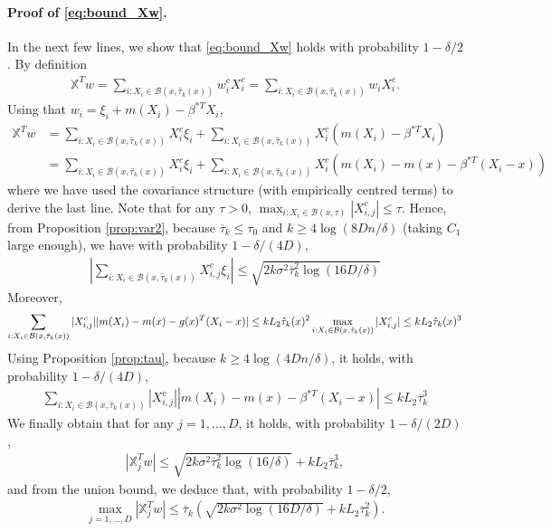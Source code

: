 \paragraph{Proof of \eqref{eq:bound_Xw}.}  In the next few lines, we show that \eqref{eq:bound_Xw} holds with probability $1-\delta/2$. By definition 
\begin{align*}
\mathbb X^T w = \sum_{i : X_i \in \mathcal B (x, \hat \tau_k(x)) }  w_i^c  X_{i}^c =\sum_{i : X_i \in \mathcal B (x, \hat \tau_k(x)) } w_i X_{i} ^c  .
\end{align*}
Using that $w_i = \xi_i+ m(X_i) - \beta^{*T} X_i$,
\begin{align*}
   \mathbb X^T w  & = \sum_{i : X_i \in \mathcal B (x, \hat \tau_k(x)) } X_{i} ^c \xi_i   +  \sum_{i : X_i \in \mathcal B (x, \hat \tau_k(x)) } X_{i} ^c (m(X_i) - \beta^{*T}X_i)\\
 &= \sum_{i : X_i \in \mathcal B (x, \hat \tau_k(x)) } X_{i} ^c \xi_i    +\sum_{i : X_i \in \mathcal B (x, \hat \tau_k(x)) } X_{i} ^c (m(X_i) - m(x) - \beta^{*T}(X_i-x) )
\end{align*}
where we have used the covariance structure (with empirically centred terms) to derive the last line.
Note that for any $\tau >0$, $\max_{i : X_i \in \mathcal B (x,  \tau )} |  X_{i,j} ^c| \leq  \tau$.  Hence, from Proposition \ref{prop:var2}, because $\overline \tau_k\leq \tau_0$ and $k\geq 4   \log( 8D n/\delta)$ (taking $C_1$ large enough), we have with probability $1-\delta / (4D)$,
\begin{align*}
\left|  \sum_{i : X_i \in \mathcal B (x, \hat \tau_k(x)) } X_{i,j} ^c \xi_i   \right| \leq \sqrt{ 2 k \sigma^2 \overline \tau_k ^2 \log(16D/\delta) }
\end{align*}
Moreover,
\begin{equation*}
\sum_{i : X_i \in \mathcal B (x, \hat \tau_k(x)) } | X_{i,j} ^c|  | m (X_i) -  m (x) - g(x) ^{T}(X_i-x) | \leq\\
 k L_2 \hat \tau_k (x) ^2 \max_{i : X_i \in \mathcal B (x, \hat \tau_k(x) )} |  X_{i,j} ^c| \leq k L_2 \hat \tau_k (x) ^3
\end{equation*}
Using Proposition \ref{prop:tau}, because $k\geq 4   \log( 4D n/\delta) $, it holds, with probability $1-\delta/(4D)$,
\begin{align*}
\sum_{i : X_i \in \mathcal B (x, \hat \tau_k(x)) } | X_{i,j} ^c|  | m (X_i) -  m (x) - \beta^{*T}(X_i-x) | \leq  k L_2 \overline \tau_k  ^3
\end{align*}
We finally obtain that for any $j=1,\ldots, D$, it holds, with probability $1-\delta/(2D)$,
\begin{align*}
|   \mathbb X^T_j w | \leq  \sqrt{2 k \sigma^2 \overline \tau_k ^2 \log(16/\delta) } +   k L_2 \overline \tau_k ^3,
\end{align*}
and from the union bound, we deduce that, with probability $1-\delta/2$,
\begin{align*}
\max_{j=1,\ldots, D} |   \mathbb X^T_j w | \leq  \overline \tau_k   \left( \sqrt{2 k  \sigma^2   \log(16D/\delta) } + kL_2 \overline \tau_k  ^2\right).
\end{align*}

